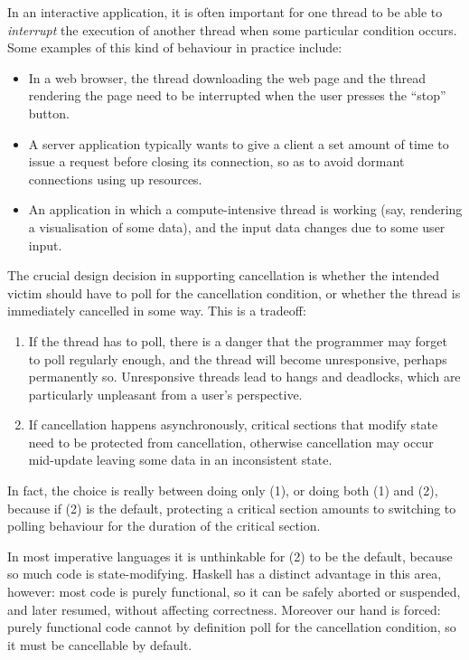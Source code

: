 
In an interactive application, it is often important for one thread to
be able to \emph{interrupt} the execution of another thread when some
particular condition occurs.  Some examples of this kind of behaviour
in practice include:

\begin{itemize}
\item In a web browser, the thread downloading the web page and the
  thread rendering the page need to be interrupted when the user
  presses the ``stop'' button.

\item A server application typically wants to give a client a set
  amount of time to issue a request before closing its connection, so
  as to avoid dormant connections using up resources.

\item An application in which a compute-intensive thread is working
  (say, rendering a visualisation of some data), and the input data
  changes due to some user input.
\end{itemize}

The crucial design decision in supporting cancellation is whether the
intended victim should have to poll for the cancellation condition,
or whether the thread is immediately cancelled in some way.  This is a
tradeoff:

\begin{enumerate}
\item If the thread has to poll, there is a danger that the programmer
  may forget to poll regularly enough, and the thread will become
  unresponsive, perhaps permanently so.  Unresponsive threads lead to
  hangs and deadlocks, which are particularly unpleasant from a
  user's perspective.
\item If cancellation happens asynchronously, critical sections that
  modify state need to be protected from cancellation, otherwise
  cancellation may occur mid-update leaving some data in an
  inconsistent state.
\end{enumerate}

In fact, the choice is really between doing only (1), or doing both
(1) and (2), because if (2) is the default, protecting a critical
section amounts to switching to polling behaviour for the duration of
the critical section.

In most imperative languages it is unthinkable for (2) to be the
default, because so much code is state-modifying.  Haskell has a
distinct advantage in this area, however: most code is purely
functional, so it can be safely aborted or suspended, and later
resumed, without affecting correctness.  Moreover our hand is
forced: purely functional code cannot by definition poll for the
cancellation condition, so it must be cancellable by default.

